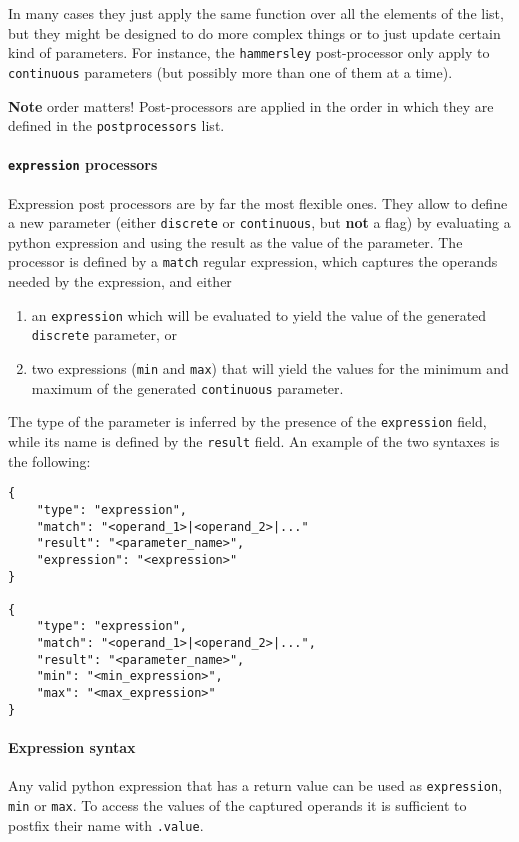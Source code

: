 \documentclass[11pt,notitlepage,twoside,a4paper]{article}
\begin{document}
In many cases they just apply the same function over all the elements of
the list, but they might be designed to do more complex things or to
just update certain kind of parameters. For instance, the
\texttt{hammersley} post-processor only apply to \texttt{continuous}
parameters (but possibly more than one of them at a time).

\textbf{Note} order matters! Post-processors are applied in the order in
which they are defined in the \texttt{postprocessors} list.

\paragraph{\texttt{expression} processors}

Expression post processors are by far the most flexible ones. They allow
to define a new parameter (either \texttt{discrete} or
\texttt{continuous}, but \textbf{not} a flag) by evaluating a python
expression and using the result as the value of the parameter. The
processor is defined by a \texttt{match} regular expression, which
captures the operands needed by the expression, and either

\begin{enumerate}
\item
  an \texttt{expression} which will be evaluated to yield the value of
  the generated \texttt{discrete} parameter, or
\item
  two expressions (\texttt{min} and \texttt{max}) that will yield the
  values for the minimum and maximum of the generated
  \texttt{continuous} parameter.
\end{enumerate}

The type of the parameter is inferred by the presence of the
\texttt{expression} field, while its name is defined by the
\texttt{result} field. An example of the two syntaxes is the following:

\begin{lstlisting}
{
    "type": "expression",
    "match": "<operand_1>|<operand_2>|..."
    "result": "<parameter_name>",
    "expression": "<expression>"
}

{
    "type": "expression",
    "match": "<operand_1>|<operand_2>|...",
    "result": "<parameter_name>",
    "min": "<min_expression>",
    "max": "<max_expression>"
}
\end{lstlisting}

\paragraph{Expression syntax} Any valid python expression that has a return value can be used as
\texttt{expression}, \texttt{min} or \texttt{max}. To access the values
of the captured operands it is sufficient to postfix their name with
\texttt{.value}.
\end{document}
